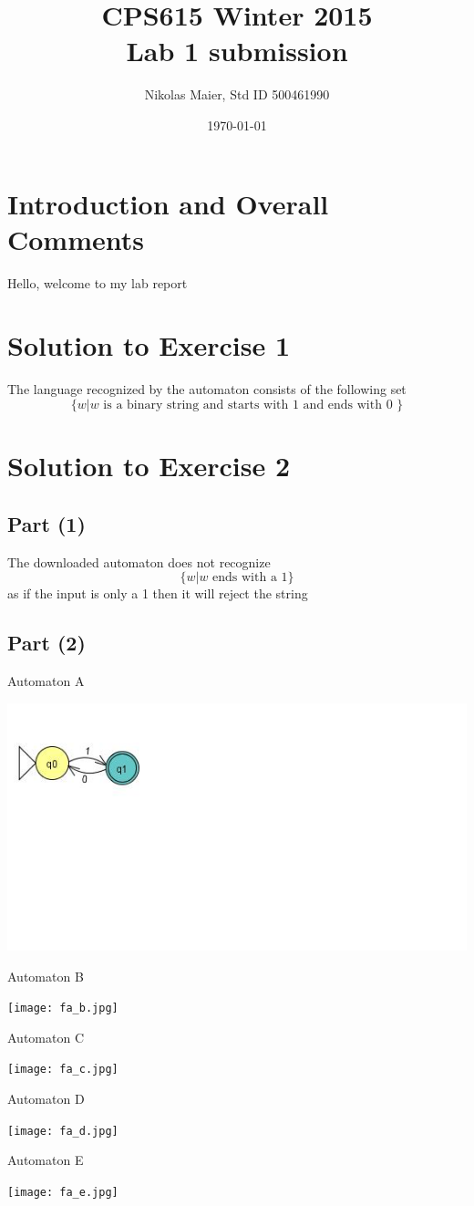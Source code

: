 \documentclass[11pt, fleqn]{article}
\title{CPS615 Winter 2015\\Lab 1 submission}
\author{Nikolas Maier, Std ID 500461990}
\date{\today}
\begin{document}
\maketitle
\section{Introduction and Overall Comments}
Hello, welcome to my lab report 

\section*{Solution to Exercise 1}

The language recognized by the automaton consists of the following set 
\[
\{w|w \mbox{ is a binary string and starts with 1 and ends with 0 }\}
\]

\section*{Solution to Exercise 2}

\subsection*{Part (1)}
The downloaded automaton does not recognize 
\[
\{w|w \mbox{ ends with a 1}\}
\]
as if the input is only a 1 then it will reject the string

\subsection*{Part (2)}
Automaton A 

\includegraphics[scale=0.5]{fa-a.jpg}

\pagebreak

Automaton B 

\texttt{[image: fa\_b.jpg]}

Automaton C

\texttt{[image: fa\_c.jpg]}

Automaton D

\texttt{[image: fa\_d.jpg]}

\pagebreak
Automaton E

\texttt{[image: fa\_e.jpg]}
\end{document}
